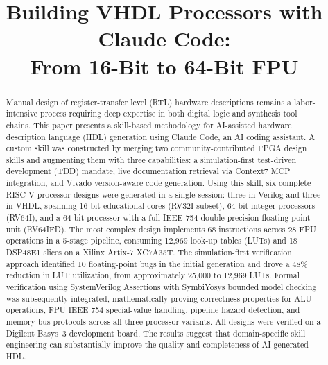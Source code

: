\documentclass[conference]{IEEEtran}
\begin{document}
\title{Building VHDL Processors with Claude Code:\\From 16-Bit to 64-Bit FPU}

\author{
}

\maketitle

\begin{abstract}
Manual design of register-transfer level (RTL) hardware descriptions remains a labor-intensive process requiring deep expertise in both digital logic and synthesis tool chains. This paper presents a skill-based methodology for AI-assisted hardware description language (HDL) generation using Claude Code, an AI coding assistant. A custom skill was constructed by merging two community-contributed FPGA design skills and augmenting them with three capabilities: a simulation-first test-driven development (TDD) mandate, live documentation retrieval via Context7 MCP integration, and Vivado version-aware code generation. Using this skill, six complete RISC-V processor designs were generated in a single session: three in Verilog and three in VHDL, spanning 16-bit educational cores (RV32I subset), 64-bit integer processors (RV64I), and a 64-bit processor with a full IEEE 754 double-precision floating-point unit (RV64IFD). The most complex design implements 68 instructions across 28 FPU operations in a 5-stage pipeline, consuming 12,969 look-up tables (LUTs) and 18 DSP48E1 slices on a Xilinx Artix-7 XC7A35T. The simulation-first verification approach identified 10 floating-point bugs in the initial generation and drove a 48\% reduction in LUT utilization, from approximately 25,000 to 12,969 LUTs. Formal verification using SystemVerilog Assertions with SymbiYosys bounded model checking was subsequently integrated, mathematically proving correctness properties for ALU operations, FPU IEEE 754 special-value handling, pipeline hazard detection, and memory bus protocols across all three processor variants. All designs were verified on a Digilent Basys~3 development board. The results suggest that domain-specific skill engineering can substantially improve the quality and completeness of AI-generated HDL.
\end{abstract}
\end{document}
